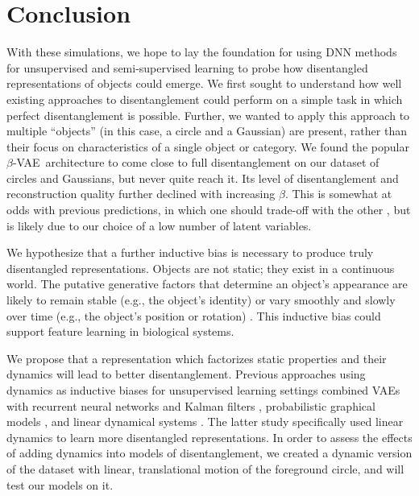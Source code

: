 \documentclass[10pt,letterpaper]{article}
\newcommand{\bvae}{$\beta$-VAE~}
\begin{document}
\section{Conclusion}

With these simulations, we hope to lay the foundation for using DNN methods for unsupervised and semi-supervised learning to probe how disentangled representations of objects could emerge. We first sought to understand how well existing approaches to disentanglement could perform on a simple task in which perfect disentanglement is possible. Further, we wanted to apply this approach to multiple ``objects'' (in this case, a circle and a Gaussian) are present, rather than their focus on characteristics of a single object or category. We found the popular \bvae architecture to come close to full disentanglement on our dataset of circles and Gaussians, but never quite reach it. Its level of disentanglement and reconstruction quality further declined with increasing $\beta$. This is somewhat at odds with previous predictions, in which one should trade-off with the other \cite{Higgins2017,Alemi2017}, but is likely due to our choice of a low number of latent variables.

We hypothesize that a further inductive bias is necessary to produce truly disentangled representations. Objects are not static; they exist in a continuous world. The putative generative factors that determine an object’s appearance are likely to remain stable (e.g., the object's identity) or vary smoothly and slowly over time (e.g., the object's position or rotation) \cite{Wiskott2002}. This inductive bias could support feature learning in biological systems.

We propose that a representation which factorizes static properties and their dynamics will lead to better disentanglement. Previous approaches using dynamics as inductive biases for unsupervised learning settings combined VAEs with recurrent neural networks and Kalman filters \cite{Krishnan2015}, probabilistic graphical models \cite{Karl2016,Johnson2016}, and linear dynamical systems \cite{Archer2016,Johnson2016,Watter2015,Fraccaro2017a}. The latter study specifically used linear dynamics to learn more disentangled representations. In order to assess the effects of adding dynamics into models of disentanglement, we created a dynamic version of the dataset with linear, translational motion of the foreground circle, and will test our models on it.

\bigskip



\setlength{\bibleftmargin}{.125in}
\setlength{\bibindent}{-\bibleftmargin}

\end{document}
